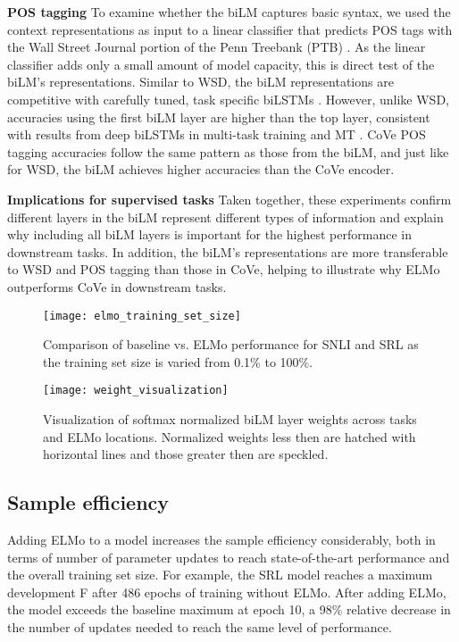 \documentclass[11pt,a4paper]{article}
\newcommand{\ELMO}{ELMo}
\newcommand{\tinysection}[1]{\textbf{#1}}
\begin{document}
\tinysection{POS tagging}
To examine whether the biLM captures basic syntax, we used the context representations as input to a linear classifier that predicts POS tags with the Wall Street Journal portion of the Penn Treebank (PTB) \citep{Marcus1993BuildingAL}.
As the linear classifier adds only a small amount of model capacity, this is direct test of the biLM's representations.
Similar to WSD, the biLM representations are competitive with carefully tuned, task specific biLSTMs \citep{Ling2015FindingFI,Ma2016EndtoendSL}.
However, unlike WSD, accuracies using the first biLM layer are higher than the top layer, consistent with results from deep biLSTMs in multi-task training \citep{Sgaard2016DeepML,joint-many-iclr07} and MT \citep{Belinkov2017WhatDN}.
CoVe POS tagging accuracies follow the same pattern as those from the biLM, and just like for WSD, the biLM achieves higher accuracies than the CoVe encoder.

\tinysection{Implications for supervised tasks}
Taken together, these experiments confirm different layers in the biLM represent different types of information and explain why including all biLM layers is important for the highest performance in downstream tasks.
In addition, the biLM's representations are more transferable to WSD and POS tagging than those in CoVe, 
helping to illustrate why \ELMO{} outperforms CoVe in downstream tasks. 



\begin{figure}
\centering
  \label{fig:small_data}
  \texttt{[image: elmo\_training\_set\_size]}
  \caption{Comparison of baseline vs. \ELMO{} performance for SNLI and SRL as the training set size is varied from 0.1\% to 100\%.
}
\end{figure}

\begin{figure}
  \label{fig:weight_visualization}
  \texttt{[image: weight\_visualization]}
  \caption{Visualization of softmax normalized biLM layer weights across tasks and \ELMO{} locations.  Normalized weights less then  are hatched with horizontal lines and those greater then  are speckled.
  }
\end{figure}




\subsection{Sample efficiency}
\label{sec:sample_efficiency}
Adding \ELMO{} to a model increases the sample efficiency considerably, both in terms of number of parameter updates to reach state-of-the-art performance and the overall training set size. For example, the SRL model reaches a maximum development F after 486 epochs of training without \ELMO.  After adding \ELMO, the model exceeds the baseline maximum at epoch 10, a 98\% relative decrease in the number of updates needed to reach the same level of performance.
\end{document}
